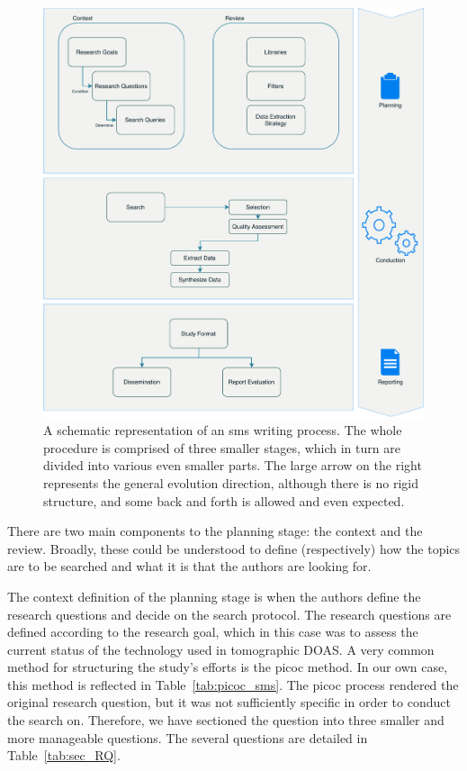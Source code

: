 \begin{figure}[htpb]
    \centering
    \includegraphics[width=.8\textwidth]{img/pdf/sms_planning.pdf}
    \caption{A schematic representation of an \gls{sms} writing process.
    The whole procedure is comprised of three smaller stages, which in
    turn are divided into various even smaller parts. The large arrow on the
    right represents the general evolution direction, although there is no
    rigid structure, and some back and forth is allowed and even expected.}
    \label{fig:sms_planning}
\end{figure}

There are two main components to the planning stage: the context and the
review. Broadly, these could be understood to define (respectively) how
the topics are to be searched and what it is that the authors are
looking for.

The context definition of the planning stage is when the authors define
the research questions and decide on the search protocol. The research
questions are defined according to the research goal, which in this case
was to assess the current status of the technology used in tomographic
\gls{DOAS}. A very common method for structuring the study's efforts is
the \gls{picoc} method. In our own case, this method is reflected in
Table~\ref{tab:picoc_sms}. The \gls{picoc} process rendered the original
research question, but it was not sufficiently specific in order to
conduct the search on. Therefore, we have sectioned the question into
three smaller and more manageable questions. The several questions are
detailed in Table~\ref{tab:sec_RQ}.

